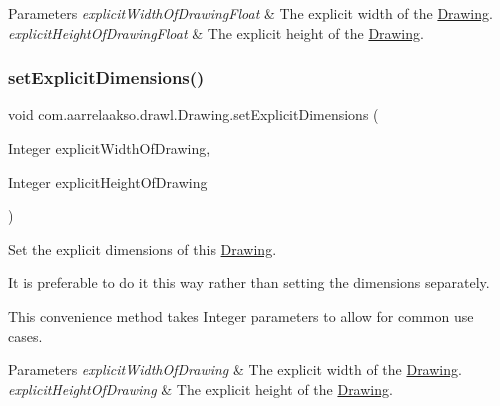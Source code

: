 \begin{DoxyParams}{Parameters}
{\em explicit\+Width\+Of\+Drawing\+Float} & The explicit width of the \hyperlink{classcom_1_1aarrelaakso_1_1drawl_1_1_drawing}{Drawing}. \\
\hline
{\em explicit\+Height\+Of\+Drawing\+Float} & The explicit height of the \hyperlink{classcom_1_1aarrelaakso_1_1drawl_1_1_drawing}{Drawing}. \\
\hline
\end{DoxyParams}
\mbox{\label{classcom_1_1aarrelaakso_1_1drawl_1_1_drawing_aaba87ad07d1574f91ea08f5022caf507}} 
\subsubsection{\texorpdfstring{set\+Explicit\+Dimensions()}{setExplicitDimensions()}\hspace{0.1cm}{\footnotesize\ttfamily [2/2]}}
{\footnotesize\ttfamily void com.\+aarrelaakso.\+drawl.\+Drawing.\+set\+Explicit\+Dimensions (\begin{DoxyParamCaption}\item[{Integer}]{explicit\+Width\+Of\+Drawing,  }\item[{Integer}]{explicit\+Height\+Of\+Drawing }\end{DoxyParamCaption})}



Set the explicit dimensions of this \hyperlink{classcom_1_1aarrelaakso_1_1drawl_1_1_drawing}{Drawing}. 

It is preferable to do it this way rather than setting the dimensions separately. 

This convenience method takes Integer parameters to allow for common use cases.


\begin{DoxyParams}{Parameters}
{\em explicit\+Width\+Of\+Drawing} & The explicit width of the \hyperlink{classcom_1_1aarrelaakso_1_1drawl_1_1_drawing}{Drawing}. \\
\hline
{\em explicit\+Height\+Of\+Drawing} & The explicit height of the \hyperlink{classcom_1_1aarrelaakso_1_1drawl_1_1_drawing}{Drawing}. \\
\hline
\end{DoxyParams}
\mbox{\label{classcom_1_1aarrelaakso_1_1drawl_1_1_drawing_aac2e3632f849c85ff46669fac4098a7c}} 
